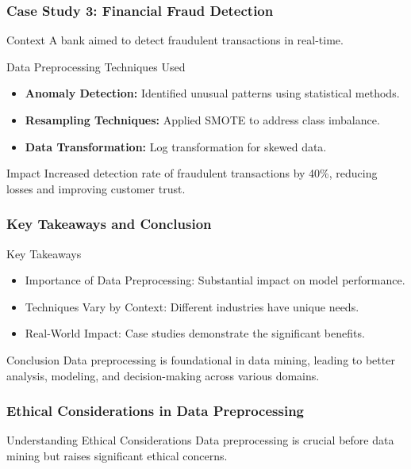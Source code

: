 \documentclass[aspectratio=169]{beamer}
\begin{document}
\begin{frame}[fragile]
    \frametitle{Case Study 3: Financial Fraud Detection}
    \begin{block}{Context}
        A bank aimed to detect fraudulent transactions in real-time.
    \end{block}
    \begin{block}{Data Preprocessing Techniques Used}
        \begin{itemize}
            \item \textbf{Anomaly Detection:} Identified unusual patterns using statistical methods.
            \item \textbf{Resampling Techniques:} Applied SMOTE to address class imbalance.
            \item \textbf{Data Transformation:} Log transformation for skewed data.
        \end{itemize}
    \end{block}
    \begin{block}{Impact}
        Increased detection rate of fraudulent transactions by 40\%, reducing losses and improving customer trust.
    \end{block}
\end{frame}

\begin{frame}[fragile]
    \frametitle{Key Takeaways and Conclusion}
    \begin{block}{Key Takeaways}
        \begin{itemize}
            \item Importance of Data Preprocessing: Substantial impact on model performance.
            \item Techniques Vary by Context: Different industries have unique needs.
            \item Real-World Impact: Case studies demonstrate the significant benefits.
        \end{itemize}
    \end{block}
    \begin{block}{Conclusion}
        Data preprocessing is foundational in data mining, leading to better analysis, modeling, and decision-making across various domains.
    \end{block}
\end{frame}

\begin{frame}[fragile]
    \frametitle{Ethical Considerations in Data Preprocessing}
    \begin{block}{Understanding Ethical Considerations}
        Data preprocessing is crucial before data mining but raises significant ethical concerns. 
    \end{block}
\end{frame}
\end{document}
